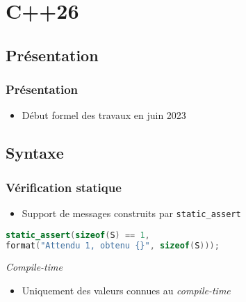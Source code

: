 \documentclass[C++.tex]{subfiles}
\begin{document}
\section{C++26}
\subsection*{Présentation}
\begin{frame}
	\frametitle{Présentation}
	\begin{itemize}
		\item Début formel des travaux en juin 2023
	\end{itemize}
\end{frame}

\subsection*{Syntaxe}
\begin{frame}[fragile]
	\frametitle{Vérification statique}
	\begin{itemize}
		\item Support de messages construits par \lstinline|static_assert|
	\end{itemize}

	\begin{lstlisting}[language=C++]
static_assert(sizeof(S) == 1,
format("Attendu 1, obtenu {}", sizeof(S)));\end{lstlisting}

	\begin{alertblock}{\textit{Compile-time}}
		\begin{itemize}
			\item Uniquement des valeurs connues au \textit{compile-time}
		\end{itemize}
	\end{alertblock}

\end{frame}
\end{document}
